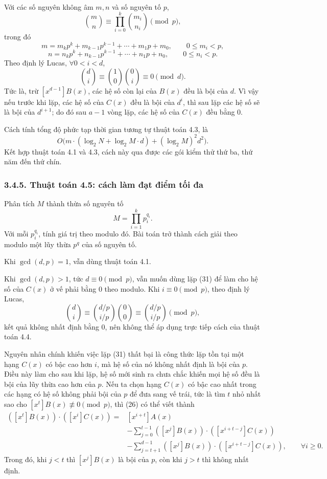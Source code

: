 \documentclass[11pt]{article}
\begin{document}
\paragraph{}
Với các số nguyên không âm \(m,n\) và số nguyên tố \(p\),
\[
  \binom{m}{n}\equiv \prod_{i=0}^{k}\binom{m_i}{n_i}\pmod p,
\]
trong đó
\[
  m=m_kp^k+m_{k-1}p^{k-1}+\cdots+m_1p+m_0,\qquad 0\le m_i<p,
\]
\[
  n=n_kp^k+n_{k-1}p^{k-1}+\cdots+n_1p+n_0,\qquad 0\le n_i<p.
\]
Theo định lý Lucas, \(\forall 0<i<d\),
\[
  \binom{d}{i}\equiv \binom{1}{0}\binom{0}{i}\equiv0\pmod d.
\]
Tức là, trừ \([x^{d-1}]B(x)\), các hệ số còn lại của \(B(x)\) đều là bội của
\(d\). Vì vậy nếu trước khi lặp, các hệ số của \(C(x)\) đều là bội của
\(d^i\), thì sau lặp các hệ số sẽ là bội của \(d^{i+1}\); do đó sau \(a-1\)
vòng lặp, các hệ số của \(C(x)\) đều bằng \(0\).

Cách tính tổng độ phức tạp thời gian tương tự thuật toán 4.3, là
\[
  O\bigl(m\cdot(\log_2 N+\log_2 M\cdot d)+(\log_2 M)^2d^2\bigr).
\]
Kết hợp thuật toán 4.1 và 4.3, cách này qua được các gói kiểm thử thứ ba, thứ
năm đến thứ chín.

\subsubsection*{3.4.5. Thuật toán 4.5: cách làm đạt điểm tối đa}

Phân tích \(M\) thành thừa số nguyên tố
\[
  M=\prod_{i=1}^{k}p_i^{q_i}.
\]
Với mỗi \(p_i^{q_i}\), tính giá trị theo modulo đó. Bài toán trở thành cách
giải theo modulo một lũy thừa \(p^q\) của số nguyên tố.

Khi \(\gcd(d,p)=1\), vẫn dùng thuật toán 4.1.

Khi \(\gcd(d,p)>1\), tức \(d\equiv0\pmod p\), vẫn muốn dùng lặp (31) để làm
cho hệ số của \(C(x)\) ở vế phải bằng \(0\) theo modulo. Khi \(i\equiv0\pmod
p\), theo định lý Lucas,
\[
  \binom{d}{i}\equiv \binom{d/p}{i/p}\binom{0}{0}
  \equiv \binom{d/p}{i/p}\pmod p,
\]
kết quả không nhất định bằng \(0\), nên không thể áp dụng trực tiếp cách của
thuật toán 4.4.

Nguyên nhân chính khiến việc lặp (31) thất bại là công thức lặp tồn tại một
hạng \(C(x)\) có bậc cao hơn \(i\), mà hệ số của nó không nhất định là bội
của \(p\). Điều này làm cho sau khi lặp, hệ số mới sinh ra chưa chắc khiến
mọi hệ số đều là bội của lũy thừa cao hơn của \(p\). Nếu ta chọn hạng
\(C(x)\) có bậc cao nhất trong các hạng có hệ số không phải bội của \(p\) để
đưa sang vế trái, tức là tìm \(t\) nhỏ nhất sao cho
\([x^t]B(x)\not\equiv0\pmod p\), thì (26) có thể viết thành
\begin{equation*}
\begin{aligned}
  ([x^t]B(x))\cdot([x^i]C(x))
  ={}&[x^{i+t}]A(x)\\
    &-\sum_{j=0}^{t-1}([x^j]B(x))\cdot([x^{i+t-j}]C(x))\\
    &-\sum_{j=t+1}^{d-1}([x^j]B(x))\cdot([x^{i+t-j}]C(x)),
    \qquad \forall i\ge0.
\end{aligned}
\tag{32}
\end{equation*}
Trong đó, khi \(j<t\) thì \([x^j]B(x)\) là bội của \(p\), còn khi \(j>t\) thì
không nhất định.
\end{document}
